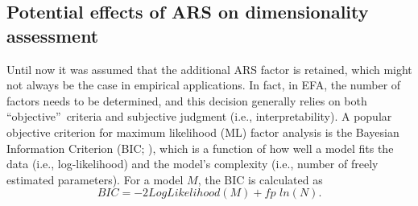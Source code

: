 \documentclass[a4paper,man,natbib]{apa6}
\begin{document}
\begin{linenumbers}

\subsection{Potential effects of ARS on dimensionality assessment}
Until now it was assumed that the additional ARS factor is retained, which might not always be the case in empirical applications. In fact, in EFA, the number of factors needs to be determined, and this decision generally relies on both \textquotedblleft objective\textquotedblright \, criteria and subjective judgment (i.e., interpretability). A popular objective criterion for maximum likelihood (ML) factor analysis is the Bayesian Information Criterion (BIC; \citealp{schwarz1978estimating}), which is a function of how well a model fits the data (i.e., log-likelihood) and the model's complexity (i.e., number of freely estimated parameters). For a model $M$, the BIC is calculated as
\begin{equation}
BIC = -2LogLikelihood(M) + fp\,\,ln(N).
\end{equation}

\end{linenumbers}
\end{document}
